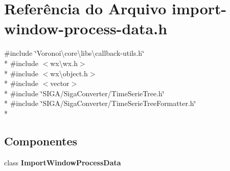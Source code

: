 \section{Referência do Arquivo import-\/window-\/process-\/data.h}
\label{import-window-process-data_8h}
{\ttfamily \#include \char`\"{}Voronoi\textbackslash{}core\textbackslash{}libs\textbackslash{}callback-\/utils.\+h\char`\"{}}\\*
{\ttfamily \#include $<$wx\textbackslash{}wx.\+h$>$}\\*
{\ttfamily \#include $<$wx\textbackslash{}object.\+h$>$}\\*
{\ttfamily \#include $<$vector$>$}\\*
{\ttfamily \#include \char`\"{}S\+I\+G\+A/\+Siga\+Converter/\+Time\+Serie\+Tree.\+h\char`\"{}}\\*
{\ttfamily \#include \char`\"{}S\+I\+G\+A/\+Siga\+Converter/\+Time\+Serie\+Tree\+Formatter.\+h\char`\"{}}\\*
\subsection*{Componentes}
\begin{DoxyCompactItemize}
\item 
class {\bf Import\+Window\+Process\+Data}
\end{DoxyCompactItemize}
